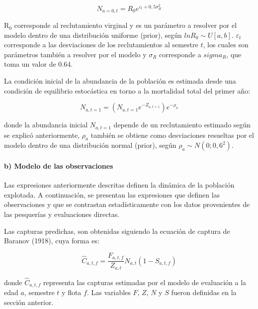 \documentclass[letter,11pt]{article}
\begin{document}
\begin{equation}
N_{a=0,t}=R_0 e^{\varepsilon_t+0,5\sigma^2_R}
\end{equation}

R$_{0}$ corresponde al reclutamiento virginal y es un par\'ametro a
resolver por el modelo dentro de una distribuci\'on uniforme (prior),
seg\'un $lnR_0 \sim U[a,b]$. $\varepsilon_t$ corresponde a las
desviaciones de los reclutamientos al semestre $t$, los cuales son
par\'ametros tambi\'en a resolver por el modelo y $\sigma_{R}$ corresponde a
$sigma_{R}$, que toma un valor de 0.64.

La condici\'on inicial de la abundancia de la poblaci\'on es estimada desde
una condici\'on de equilibrio estoc\'astica en torno a la mortalidad total
del primer a\~{n}o:

\begin{equation}
N_{a,t=1}=\left(N_{a,t=1}e^{-Z_{a,t=1}}\right)e^{-\rho_a}
\end{equation}

donde la abundancia inicial $N_{a,t=1}$ depende de un reclutamiento
estimado seg\'un se explic\'o anteriormente, $\rho_a$ tambi\'en se obtiene
como desviaciones resueltas por el modelo dentro de una distribuci\'on
normal (prior), seg\'un $\rho_a \sim N(0;0,6^2)$.


\paragraph{b) Modelo de las observaciones}

\quad

Las expresiones anteriormente descritas definen la din\'amica de la
poblaci\'on explotada. A continuaci\'on, se presentan las expresiones que
definen las observaciones y que se contrastan estad\'isticamente con los
datos provenientes de las pesquer\'ias y evaluaciones directas.

Las capturas predichas, son obtenidas siguiendo la ecuaci\'on de captura
de Baranov (1918), cuya forma es:

\begin{equation}
\hat{C}_{a,t,f}=\frac{F_{a,t,f}}{Z_{a,t}}N_{a,t}\left(1-S_{a,t,f}\right)
\end{equation}

donde $\hat{C}_{a,t,f}$ representa las capturas estimadas por el
modelo de evaluaci\'on a la edad $a$, semestre $t$ y flota $f$. Las
variables $F$, $Z$, $N$ y $S$ fueron definidas en la secci\'on
anterior.
\end{document}
